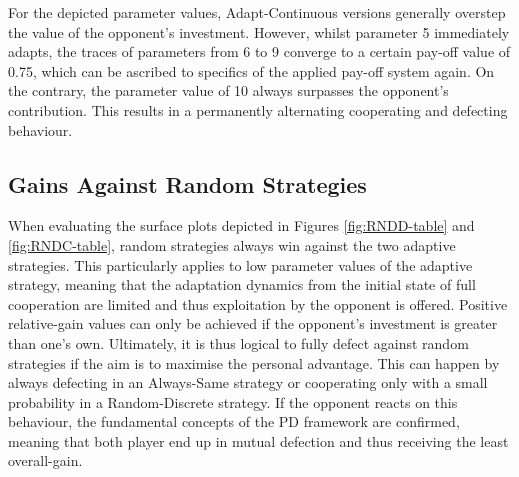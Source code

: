 \documentclass[11pt]{article}
\begin{document}
	For the depicted parameter values, Adapt-Continuous versions generally overstep the value of the opponent's investment.
	However, whilst parameter 5 immediately adapts, the traces of parameters from 6 to 9 converge to a certain pay-off value of 0.75, which can be ascribed to specifics of the applied pay-off system again.
	On the contrary, the parameter value of 10 always surpasses the opponent's contribution.
	This results in a permanently alternating cooperating and defecting behaviour.
	

\subsection{Gains Against Random Strategies} \label{sec:conclusion_discuss}
	When evaluating the surface plots depicted in Figures \ref{fig:RNDD-table} and \ref{fig:RNDC-table}, random strategies always win against the two adaptive strategies.
	This particularly applies to low parameter values of the adaptive strategy, meaning that the adaptation dynamics from the initial state of full cooperation are limited and thus exploitation by the opponent is offered.
	Positive relative-gain values can only be achieved if the opponent's investment is greater than one's own.
	Ultimately, it is thus logical to fully defect against random strategies if the aim is to maximise the personal advantage.
	This can happen by always defecting in an Always-Same strategy or cooperating only with a small probability in a Random-Discrete strategy.
	If the opponent reacts on this behaviour, the fundamental concepts of the PD framework are confirmed, meaning that both player end up in mutual defection and thus receiving the least overall-gain.
\end{document}
